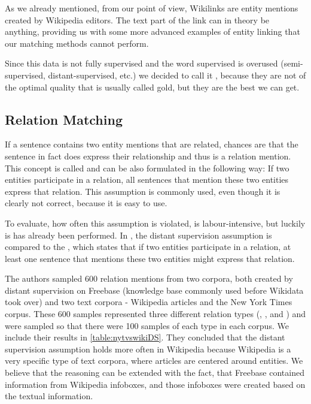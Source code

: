 As we already mentioned, from our point of view, Wikilinks are entity mentions created by Wikipedia editors. The text part of the link can in theory be anything, providing us with some more advanced examples of entity linking that our matching methods cannot perform.

Since this data is not fully supervised and the word supervised is overused (semi-supervised, distant-supervised, etc.) we decided to call it , because they are not of the optimal quality that is usually called gold, but they are the best we can get.


\subsection{Relation Matching}
If a sentence contains two entity mentions that are related, chances are that the sentence in fact does express their relationship and thus is a relation mention. This concept is called  and can be also formulated in the following way: If two entities participate in a relation, all sentences that  mention these two entities express that relation. This assumption is commonly used, even though it is clearly not correct, because it is easy to use. 

To evaluate, how often this assumption is violated, is labour-intensive, but luckily is has already been performed. In \cite{nytdistant}, the distant supervision assumption is compared to the , which states that if two entities participate in a relation, at least one sentence that mentions these two entities might express that relation. 

The authors sampled 600 relation mentions from two corpora, both created by distant supervision on Freebase (knowledge base commonly used before Wikidata took over) and two text corpora - Wikipedia articles and the New York Times corpus. These 600 samples represented three different relation types (, , and ) and were sampled so that there were 100 samples of each type in each corpus. We include their results in \autoref{table:nytvswikiDS}. They concluded that the distant supervision assumption holds more often in Wikipedia because Wikipedia is a very specific type of text corpora, where articles are centered around entities. We believe that the reasoning can be extended with the fact, that Freebase contained information from Wikipedia infoboxes, and those infoboxes were created based on the textual information. 

